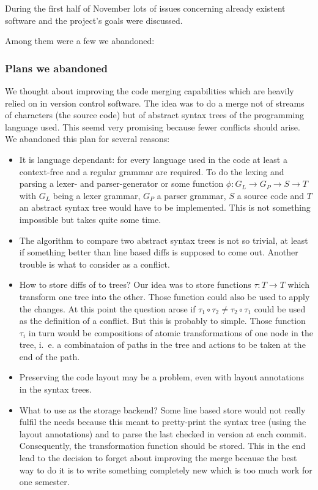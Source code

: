 \documentclass[fleqn, 10pt, a4paper]{report} \usepackage{amssymb}
\begin{document}
During the first half of November lots of issues concerning already
existent software and the project's goals were discussed.

Among them were a few we abandoned:

\subsubsection{Plans we abandoned}

We thought about improving the code merging capabilities which are
heavily relied on in version control software. The idea was to do a
merge not of streams of characters (the source code) but of abstract
syntax trees of the programming language used. This seemd very
promising because fewer conflicts should arise. We abandoned this plan
for several reasons:

\begin{itemize}
\item It is language dependant: for every language used in the code at
  least a context-free and a regular grammar are required. To do the
  lexing and parsing a lexer- and parser-generator or some function
  $\phi : G_L \rightarrow G_P \rightarrow S \rightarrow T$ with $G_L$
  being a lexer grammar, $G_P$ a parser grammar, $S$ a source code and
  $T$ an abstract syntax tree would have to be implemented. This is
  not something impossible but takes quite some time.
\item The algorithm to compare two abstract syntax trees is not so
  trivial, at least if something better than line based diffs is
  supposed to come out. Another trouble is what to consider as a
  conflict.
\item How to store diffs of to trees? Our idea was to store functions
  $\tau : T \rightarrow T$ which transform one tree into the other.
  Those function could also be used to apply the changes. At this
  point the question arose if $\tau_1 \circ \tau_2 \neq \tau_2 \circ
  \tau_1$ could be used as the definition of a conflict. But this is
  probably to simple.  Those function $\tau_i$ in turn would be
  compositions of atomic transformations of one node in the tree,
  i.~e. a combinataion of paths in the tree and actions to be taken at
  the end of the path.
\item Preserving the code layout may be a problem, even with layout
  annotations in the syntax trees.
\item What to use as the storage backend? Some line based store would
  not really fulfil the needs because this meant to pretty-print the
  syntax tree (using the layout annotations) and to parse the last
  checked in version at each commit. Consequently, the transformation
  function should be stored. This in the end lead to the decision to
  forget about improving the merge because the best way to do it is to
  write something completely new which is too much work for one
  semester.
\end{itemize}
\end{document}
